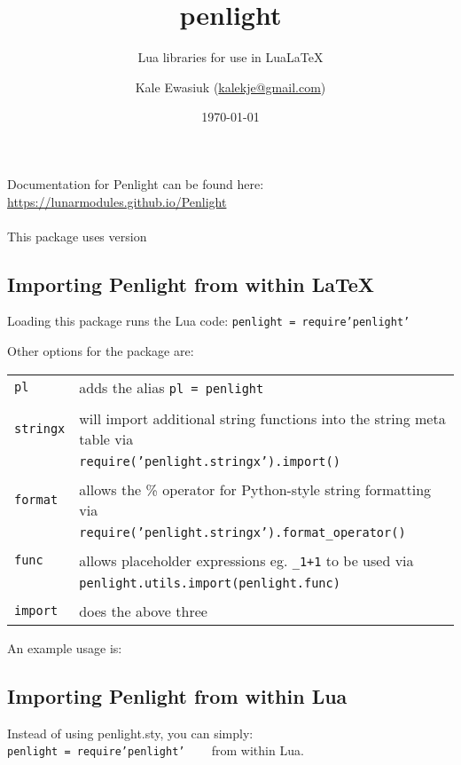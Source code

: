 \documentclass[11pt,parskip=half]{scrartcl}
\author{Kale Ewasiuk (\url{kalekje@gmail.com})}
\date{\today}
\title{penlight}
\subtitle{Lua libraries for use in LuaLaTeX}
\newcommand{\cmd}[1]{\texttt{\detokenize{#1}}}
\begin{document}
\maketitle

    Documentation for Penlight can be found here:\\
\mbox{\url{https://lunarmodules.github.io/Penlight}}
\\\\ This package uses version \cmd{1.13.1}

\subsection*{Importing Penlight from within LaTeX}
Loading this package runs the Lua code:  \texttt{penlight = require'penlight'}

Other options for the package are:
\vspace{1em}

\hspace*{-6ex}\begin{tabular}{lp{4.8in}}
\texttt{pl} & adds the alias \texttt{pl = penlight}\\\\
\texttt{stringx} & will import additional string functions into the string meta table via\\
                &  \texttt{require('penlight.stringx').import()}\\\\
\texttt{format} & allows the \% operator for Python-style string formatting via\\
        & \texttt{require('penlight.stringx').format\_operator()}\\\\
\texttt{func} & allows placeholder expressions eg. \texttt{\_1+1} to be used via\\
            &   \texttt{penlight.utils.import(penlight.func)}\\\\
\texttt{import} & does the above three\\
\end{tabular}


An example usage is: \cmd{\usepackage[pl,import]{penlight}}


\subsection*{Importing Penlight from within Lua}
Instead of using penlight.sty, you can simply:\\
\texttt{penlight = require'penlight'} ~~~ from within Lua.
\end{document}
